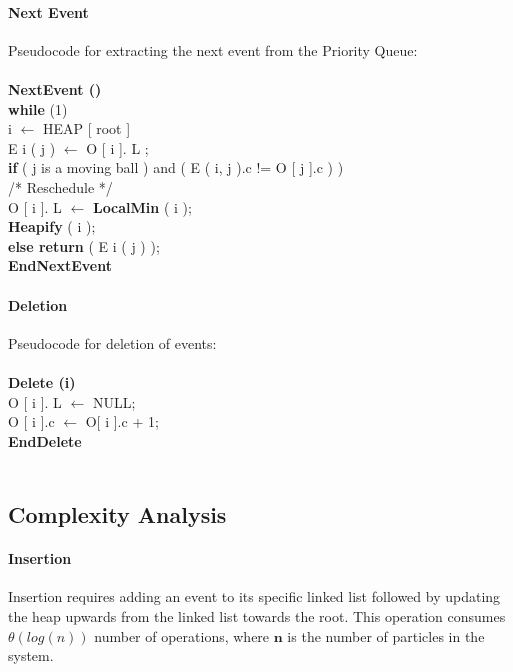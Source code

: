\documentclass[12pt]{article}
\begin{document}
\paragraph{Next Event}
Pseudocode for extracting the next event from the Priority Queue:\\ \\
\indent \indent  \textbf{NextEvent ()}\\
\indent \indent \indent \textbf{while} (1)\\
\indent \indent \indent \indent i $\leftarrow$ HEAP [ root ]\\
\indent \indent \indent \indent E i ( j ) $\leftarrow$ O [ i ]. L ;\\
\indent \indent \indent \indent \textbf{if} ( j is a moving ball ) and ( E ( i, j ).c != O [ j ].c ) )\\
\indent \indent \indent \indent \indent /* Reschedule */\\
\indent \indent \indent \indent \indent O [ i ]. L $\leftarrow$ \textbf{LocalMin} ( i );\\
\indent \indent \indent \indent \indent \textbf{Heapify} ( i );\\
\indent \indent \indent \indent \textbf{else return} ( E i ( j ) );\\
\indent \indent  \textbf{EndNextEvent}\\
\paragraph{Deletion}
Pseudocode for deletion of events: \\ \\
\indent \indent  \textbf{Delete (i)}\\
\indent \indent \indent O [ i ]. L $\leftarrow$ NULL;\\
\indent \indent \indent O [ i ].c $\leftarrow$ O[ i ].c + 1;\\
\indent \indent  \textbf{EndDelete}\\
\\

\subsection{Complexity Analysis}\label{Complexity Analysis}
\paragraph{Insertion}
Insertion requires adding an event to its specific linked list followed by updating the heap upwards from the linked list towards the root. This operation consumes $\theta(log(n))$ number of operations, where $\mathbf{n}$ is the number of particles in the system.
\end{document}
